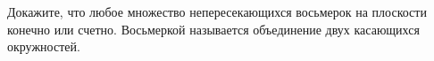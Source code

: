 Докажите, что любое множество непересекающихся восьмерок на плоскости конечно или счетно. Восьмеркой
называется объединение двух касающихся окружностей.
